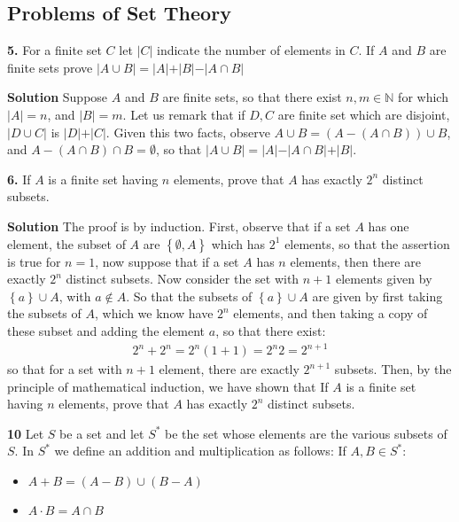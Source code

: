 \documentclass[11pt,a4paper]{article}
\begin{document}
\subsection{Problems of Set Theory}
\textbf{5.} For a finite set $C$ let $ \vert C \vert$ indicate the number of elements in $C$. If $A$ and $B$ are finite sets prove $ \vert A \cup B \vert = \vert A \vert + \vert B \vert - \vert A \cap B \vert $ \par
\textbf{Solution}
Suppose $A$ and $B$ are finite sets, so that there exist $n,m \in \mathbb{N}$ for which $ \vert A \vert = n$, and $ \vert B \vert = m$. Let us remark that if $D, C$ are finite set which are disjoint, $ \vert D \cup C \vert $ is $ \vert D \vert + \vert C \vert $. Given this two facts, observe $ A \cup B = (A - (A \cap B)) \cup B$, and $ A - (A \cap B) \cap B = \emptyset $, so that $ \vert A \cup B \vert = \vert A \vert - \vert A \cap B \vert + \vert B \vert $. \par
\textbf{6.} If $A$ is a finite set having $n$ elements, prove that $A$ has exactly $ 2^{n} $ distinct subsets. \par 
\textbf{Solution}
The proof is by induction. First, observe that if a set $A$ has one element, the subset of $A$ are $ \left\lbrace \emptyset, A \right\rbrace $ which has $ 2^{1} $ elements, so that the assertion is true for $ n = 1 $, now suppose that if a set $A$ has $n$ elements, then there are exactly $2^{n}$ distinct subsets. Now consider the set with $n+1$ elements given by $ \left\lbrace a \right\rbrace \cup A $, with $ a \not\in A $. So that the subsets of $ \left\lbrace a \right\rbrace \cup A $ are given by first taking the subsets of $A$, which we know have $2^{n}$ elements, and then taking a copy of these subset and adding the element $ a $, so that there exist:
\begin{align*}
2^n + 2^n =2^n (1 + 1) =2^n2 = 2^{n+1}
\end{align*} 
so that for a set with $n+1$ element, there are exactly $ 2^{n+1} $ subsets. Then, by the principle of mathematical induction, we have shown that If $A$ is a finite set having $n$ elements, prove that $A$ has exactly $ 2^{n} $ distinct subsets. \par
\textbf{10} Let $S$ be a set and let $S^*$ be the set whose elements are the various subsets of $S$. In $S^*$ we define an addition and multiplication as follows: If $A,B \in S^*$:
\begin{itemize}
	\item $ A + B = (A-B) \cup (B-A)$
	\item $ A \cdot B = A \cap B $
\end{itemize}
\end{document}
